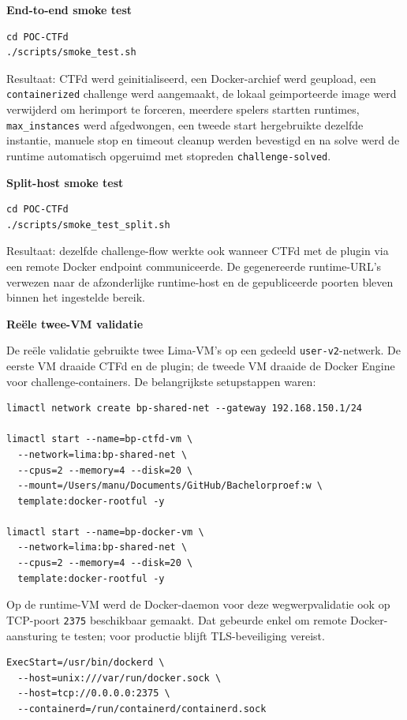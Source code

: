 \documentclass[dutch,dit,thesis]{hogentreport}
\begin{document}
\textbf{End-to-end smoke test}
\begin{verbatim}
cd POC-CTFd
./scripts/smoke_test.sh
\end{verbatim}

Resultaat: CTFd werd geinitialiseerd, een Docker-archief werd geupload, een \texttt{containerized} challenge werd aangemaakt, de lokaal geimporteerde image werd verwijderd om herimport te forceren, meerdere spelers startten runtimes, \texttt{max\_instances} werd afgedwongen, een tweede start hergebruikte dezelfde instantie, manuele stop en timeout cleanup werden bevestigd en na solve werd de runtime automatisch opgeruimd met stopreden \texttt{challenge-solved}.

\textbf{Split-host smoke test}
\begin{verbatim}
cd POC-CTFd
./scripts/smoke_test_split.sh
\end{verbatim}

Resultaat: dezelfde challenge-flow werkte ook wanneer CTFd met de plugin via een remote Docker endpoint communiceerde. De gegenereerde runtime-URL's verwezen naar de afzonderlijke runtime-host en de gepubliceerde poorten bleven binnen het ingestelde bereik.

\textbf{Re\"ele twee-VM validatie}

De re\"ele validatie gebruikte twee Lima-VM's op een gedeeld \texttt{user-v2}-netwerk. De eerste VM draaide CTFd en de plugin; de tweede VM draaide de Docker Engine voor challenge-containers. De belangrijkste setupstappen waren:

\begin{verbatim}
limactl network create bp-shared-net --gateway 192.168.150.1/24

limactl start --name=bp-ctfd-vm \
  --network=lima:bp-shared-net \
  --cpus=2 --memory=4 --disk=20 \
  --mount=/Users/manu/Documents/GitHub/Bachelorproef:w \
  template:docker-rootful -y

limactl start --name=bp-docker-vm \
  --network=lima:bp-shared-net \
  --cpus=2 --memory=4 --disk=20 \
  template:docker-rootful -y
\end{verbatim}

Op de runtime-VM werd de Docker-daemon voor deze wegwerpvalidatie ook op TCP-poort \texttt{2375} beschikbaar gemaakt. Dat gebeurde enkel om remote Docker-aansturing te testen; voor productie blijft TLS-beveiliging vereist.

\begin{verbatim}
ExecStart=/usr/bin/dockerd \
  --host=unix:///var/run/docker.sock \
  --host=tcp://0.0.0.0:2375 \
  --containerd=/run/containerd/containerd.sock
\end{verbatim}
\end{document}
